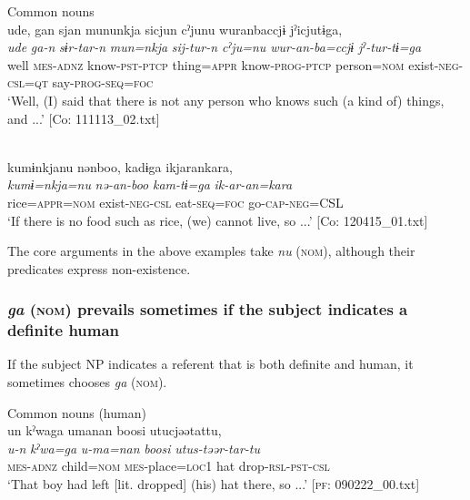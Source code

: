 \begin{styleBeschriftung}
\ea\label{ex:6-131}
 Common nouns\\

 \ea {\TM}  ude,  gan  sjan  mununkja  sicjun     cˀjunu  wuranbaccjɨ  jˀicjutɨga,\\
\glll \textit{ude}  \textit{ga-n}  \textit{sɨr-tar-n}  \textit{mun=nkja}  \textit{sij-tur-n  \textit{cˀju=nu}  \textit{wur-an-ba=ccjɨ}  \textit{jˀ-tur-tɨ=ga}}\\
well  \textsc{mes}-\textsc{adnz}  know-\textsc{pst}-\textsc{ptcp}  thing=\textsc{appr}  know-\textsc{prog}-\textsc{ptcp}  person=\textsc{nom}  exist-\textsc{neg}-\textsc{csl}=\textsc{qt}  say-\textsc{prog}-\textsc{seq}=\textsc{foc}\\
\glt ‘Well, (I) said that there is not any person who knows such (a kind of) things, and ...’ [Co: 111113\_02.txt]
\z

\ex\relax[= (\ref{ex:6-48}a)]\\
{\TM}
\glll  kumɨnkjanu  nənboo,  kadɨga  ikjarankara,\\
\textit{kumɨ=nkja=nu}  \textit{nə-an-boo}  \textit{kam-tɨ=ga}  \textit{ik-ar-an=kara}\\
rice=\textsc{appr}=\textsc{nom}  exist-\textsc{neg}-\textsc{csl}  eat-\textsc{seq}=\textsc{foc}  go-\textsc{cap}-\textsc{neg}=CSL\\
\glt ‘If there is no food such as rice, (we) cannot live, so ...’ [Co: 120415\_01.txt]
\z

The core arguments in the above examples take \textit{nu} (\textsc{nom}), although their predicates express non-existence.

\subsubsection{\textit{ga} (\textsc{nom}) prevails sometimes if the subject indicates a definite human}

If the subject NP indicates a referent that is both definite and human, it sometimes chooses \textit{ga} (\textsc{nom}).

\ea\label{ex:6-132}
 Common nouns (human)\\

 \ea {\TM}  un  kˀwaga  umanan  {\textbar}boosi{\textbar}  utucjəətattu,\\
\glll \textit{u-n}  \textit{kˀwa=ga}  \textit{u-ma=nan}  \textit{boosi}  \textit{utus-təər-tar-tu}\\
\textsc{mes}-\textsc{adnz}  child=\textsc{nom}  \textsc{mes}-place=\textsc{loc1}  hat  drop-\textsc{rsl}-\textsc{pst}-\textsc{csl}\\
\glt ‘That boy had left [lit. dropped] (his) hat there, so ...’ [\textsc{pf}: 090222\_00.txt]
\z


\end{styleBeschriftung}
